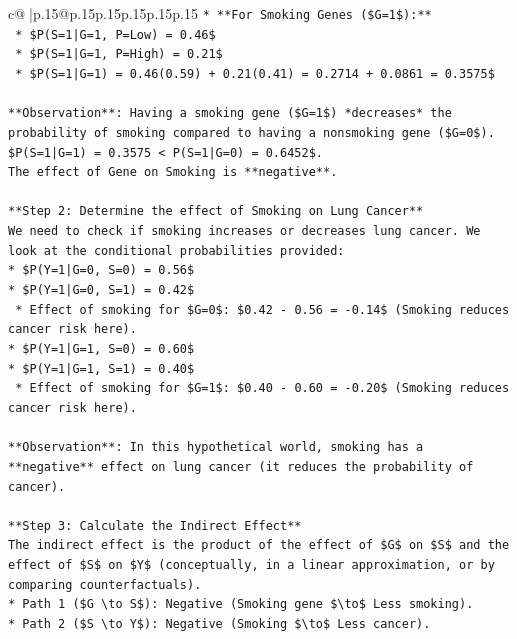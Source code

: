 \documentclass{article}
\begin{document}
{\begin{supertabular}{c@{$\;$}|p{.15\linewidth}@{}p{.15\linewidth}p{.15\linewidth}p{.15\linewidth}p{.15\linewidth}p{.15\linewidth}}
{{{\texttt{*   **For Smoking Genes (\$G=1\$):**} \\
\texttt{    *   \$P(S=1|G=1, P=Low) = 0.46\$} \\
\texttt{    *   \$P(S=1|G=1, P=High) = 0.21\$} \\
\texttt{    *   \$P(S=1|G=1) = 0.46(0.59) + 0.21(0.41) = 0.2714 + 0.0861 = 0.3575\$} \\
\\ 
\texttt{**Observation**: Having a smoking gene (\$G=1\$) *decreases* the probability of smoking compared to having a nonsmoking gene (\$G=0\$).} \\
\texttt{\$P(S=1|G=1) = 0.3575 < P(S=1|G=0) = 0.6452\$.} \\
\texttt{The effect of Gene on Smoking is **negative**.} \\
\\ 
\texttt{**Step 2: Determine the effect of Smoking on Lung Cancer**} \\
\texttt{We need to check if smoking increases or decreases lung cancer. We look at the conditional probabilities provided:} \\
\texttt{*   \$P(Y=1|G=0, S=0) = 0.56\$} \\
\texttt{*   \$P(Y=1|G=0, S=1) = 0.42\$} \\
\texttt{    *   Effect of smoking for \$G=0\$: \$0.42 {-} 0.56 = {-}0.14\$ (Smoking reduces cancer risk here).} \\
\texttt{*   \$P(Y=1|G=1, S=0) = 0.60\$} \\
\texttt{*   \$P(Y=1|G=1, S=1) = 0.40\$} \\
\texttt{    *   Effect of smoking for \$G=1\$: \$0.40 {-} 0.60 = {-}0.20\$ (Smoking reduces cancer risk here).} \\
\\ 
\texttt{**Observation**: In this hypothetical world, smoking has a **negative** effect on lung cancer (it reduces the probability of cancer).} \\
\\ 
\texttt{**Step 3: Calculate the Indirect Effect**} \\
\texttt{The indirect effect is the product of the effect of \$G\$ on \$S\$ and the effect of \$S\$ on \$Y\$ (conceptually, in a linear approximation, or by comparing counterfactuals).} \\
\texttt{*   Path 1 (\$G \textbackslash{}to S\$): Negative (Smoking gene \$\textbackslash{}to\$ Less smoking).} \\
\texttt{*   Path 2 (\$S \textbackslash{}to Y\$): Negative (Smoking \$\textbackslash{}to\$ Less cancer).} \\
}}}
\end{supertabular}}
\end{document}
